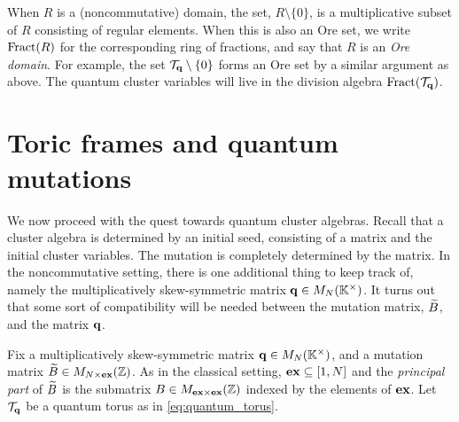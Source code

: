 When $R$ is a (noncommutative) domain, the set, $R \setminus \{0\}$, is a
multiplicative subset of $R$ consisting of regular elements. When this is also an Ore
set, we write $\operatorname{Fract}(R)$ for the corresponding ring of
fractions, and say that $R$ is an \emph{Ore domain}. For example, the set $\mathcal{T}_{\mathbf{q}} \setminus \{0\}$ forms an Ore set by a
similar argument as above. The quantum cluster variables will live in the division
algebra $\operatorname{Fract}(\mathcal{T}_{\mathbf{q}})$.

\section{Toric frames and quantum mutations}

We now proceed with the quest towards quantum cluster algebras. Recall that a cluster
algebra is determined by an initial seed, consisting of a matrix and the initial
cluster variables. The mutation is completely determined by the matrix. In the
noncommutative setting, there is one additional thing to keep track of, namely the
multiplicatively skew-symmetric matrix $\mathbf{q} \in M_N(\mathbb{K}^\times)$. It turns out that
some sort of compatibility will be needed between the mutation matrix, $\widetilde{B}$, and the
matrix $\mathbf{q}$.

Fix a multiplicatively skew-symmetric matrix $\mathbf{q} \in M_N (\mathbb{K}^\times)$, and a
mutation matrix $\widetilde{B} \in M_{N \times \mathbf{ex}}(\mathbb{Z})$. As in the classical setting, $\mathbf{ex}
	\subseteq [1, N]$ and the \emph{principal part} of $\widetilde{B}$ is the
submatrix $B \in M_{\mathbf{ex} \times \mathbf{ex}}(\mathbb{Z})$ indexed by the elements of $\mathbf{ex}$. Let
$\mathcal{T}_{\mathbf{q}}$ be a quantum torus as in \cref{eq:quantum_torus}.

